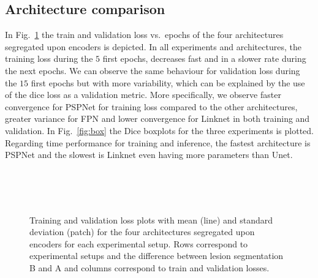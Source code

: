 \documentclass{elsarticle}
\begin{document}
\subsection{Architecture comparison}
In Fig.~\ref{fig:loss} the train and validation loss vs.\ epochs of the four architectures segregated upon encoders is depicted.
In all experiments and architectures, the training loss during the $5$ first epochs, decreases fast and in a slower rate during the next epochs.
We can observe the same behaviour for validation loss during the $15$ first epochs but with more variability, which can be explained by the use of the dice loss as a validation metric.
More specifically, we observe faster convergence for PSPNet for training loss compared to the other architectures, greater variance for FPN and lower convergence for Linknet in both training and validation.
In Fig.~\ref{fig:box} the Dice boxplots for the three experiments is plotted.
Regarding time performance for training and inference, the fastest architecture is PSPNet and the slowest is Linknet even having more parameters than Unet.

\begin{figure}[!t]
	\centering
	\\
	\\
	\\
	\setcounter{subfigure}{0}
	\caption{Training and validation loss plots with mean (line) and standard deviation (patch) for the four architectures segregated upon encoders for each experimental setup.
	Rows correspond to experimental setups and the difference between lesion segmentation B and A and columns correspond to train and validation losses.}
	\label{fig:loss}
\end{figure}
\end{document}
